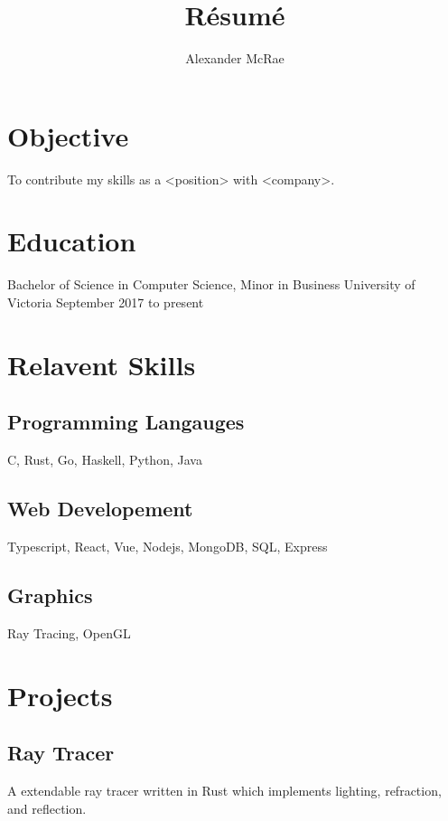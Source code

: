 \documentclass{article}
\begin{document}
\title{R\'esum\'e}
\author{Alexander McRae}

\maketitle

\section{Objective}

To contribute my skills as a <position> with <company>.

\section{Education}

Bachelor of Science in Computer Science, Minor in Business
University of Victoria
September 2017 to present

\section{Relavent Skills}

\subsection{Programming Langauges}

C, Rust, Go, Haskell, Python, Java

\subsection{Web Developement}

Typescript, React, Vue, Nodejs, MongoDB, SQL, Express

\subsection{Graphics}

Ray Tracing, OpenGL

\section{Projects}

\subsection{Ray Tracer}

A extendable ray tracer written in Rust which implements lighting,
refraction, and reflection.
\end{document}
